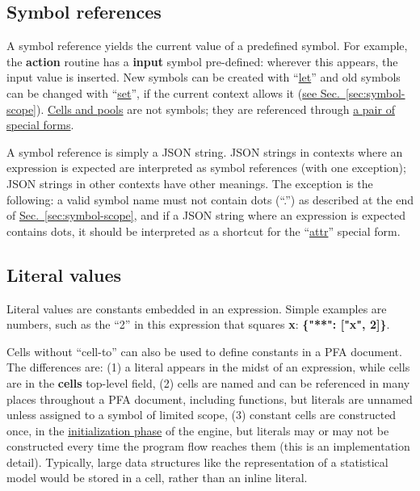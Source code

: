 \documentclass{article}
\newcommand{\PFAc}{\ttfamily\bfseries}
\theoremstyle{definition}
\begin{document}
\hypertarget{hsec:symbol-ref}{}
\subsection{Symbol references}
\label{sec:symbol-ref}

A symbol reference yields the current value of a predefined symbol.  For example, the {\PFAc action} routine has a {\PFAc input} symbol pre-defined: wherever this appears, the input value is inserted.  New symbols can be created with ``\hyperlink{hsec:let-set}{let}'' and old symbols can be changed with ``\hyperlink{hsec:let-set}{set}'', if the current context allows it (\hyperlink{hsec:symbol-scope}{see Sec.~\ref{sec:symbol-scope}}).  \hyperlink{hsec:cells-pools}{Cells and pools} are not symbols; they are referenced through \hyperlink{hsec:cell-pool-forms}{a pair of special forms}.

A symbol reference is simply a JSON string.  JSON strings in contexts where an expression is expected are interpreted as symbol references (with one exception); JSON strings in other contexts have other meanings.  The exception is the following: a valid symbol name must not contain dots (``.'') as described at the end of \hyperlink{hsec:symbol-scope}{Sec.~\ref{sec:symbol-scope}}, and if a JSON string where an expression is expected contains dots, it should be interpreted as a shortcut for the ``\hyperlink{hsec:attr-form}{attr}'' special form.

\hypertarget{hsec:literals}{}
\subsection{Literal values}
\label{sec:literals}

Literal values are constants embedded in an expression.  Simple examples are numbers, such as the ``2'' in this expression that squares {\PFAc x}: {\PFAc \{"**":$\!$ ["x", 2]\}}.

Cells without ``cell-to'' can also be used to define constants in a PFA document.  The differences are: (1) a literal appears in the midst of an expression, while cells are in the {\PFAc cells} top-level field, (2) cells are named and can be referenced in many places throughout a PFA document, including functions, but literals are unnamed unless assigned to a symbol of limited scope, (3) constant cells are constructed once, in the \hyperlink{hsec:phases}{initialization phase} of the engine, but literals may or may not be constructed every time the program flow reaches them (this is an implementation detail).  Typically, large data structures like the representation of a statistical model would be stored in a cell, rather than an inline literal.
\end{document}
